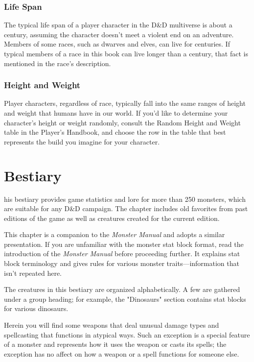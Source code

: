 \documentclass[10pt,a4paper,twoside,bg=print,twocolumn,openany,nodeprecatedcode]{dndbook}
\begin{document}
\subsection{Life Span}
The typical life span of a player character in the D\&D multiverse is about a century, assuming the character doesn't meet a violent end on an adventure. Members of some races, such as dwarves and elves, can live for centuries. If typical members of a race in this book can live longer than a century, that fact is mentioned in the race's description.

\subsection{Height and Weight}
Player characters, regardless of race, typically fall into the same ranges of height and weight that humans have in our world. If you'd like to determine your character's height or weight randomly, consult the Random Height and Weight table in the Player's Handbook, and choose the row in the table that best represents the build you imagine for your character.

\chapter{Bestiary}
his bestiary provides game statistics and lore for more than 250 monsters, which are suitable for any D\&D campaign. The chapter includes old favorites from past editions of the game as well as creatures created for the current edition.


This chapter is a companion to the \textit{Monster Manual} and adopts a similar presentation. If you are unfamiliar with the monster stat block format, read the introduction of the \textit{Monster Manual} before proceeding further. It explains stat block terminology and gives rules for various monster traits—information that isn't repeated here.

The creatures in this bestiary are organized alphabetically. A few are gathered under a group heading; for example, the "Dinosaurs" section contains stat blocks for various dinosaurs.

Herein you will find some weapons that deal unusual damage types and spellcasting that functions in atypical ways. Such an exception is a special feature of a monster and represents how it uses the weapon or casts its spells; the exception has no affect on how a weapon or a spell functions for someone else.
\end{document}
